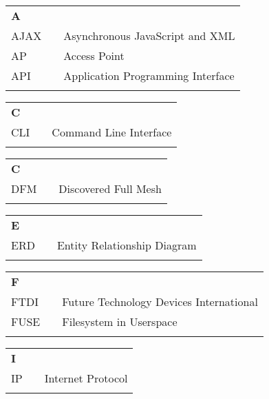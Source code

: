 \documentclass{mipathesis}
\begin{document}
\tableofcontents
{}
\listoftables
{}
\listoffigures
{}

\singkatan
\noindent

\begin{tabular}{p{20pt}p{3pt}l}
\textbf{A}\\
AJAX & & Asynchronous JavaScript and XML\\
AP & & Access Point\\
API & & Application Programming Interface\\
\\
\end{tabular}

\begin{tabular}{p{20pt}p{3pt}l}
\textbf{C}\\
CLI & & Command Line Interface\\
\\
\end{tabular}

\begin{tabular}{p{20pt}p{3pt}l}
\textbf{C}\\
DFM & & Discovered Full Mesh\\
\\
\end{tabular}

\begin{tabular}{p{20pt}p{3pt}l}
\textbf{E}\\
ERD & & Entity Relationship Diagram\\
\\
\end{tabular}

\begin{tabular}{p{20pt}p{3pt}l}
\textbf{F}\\
FTDI & & Future Technology Devices International\\
FUSE & & Filesystem in Userspace\\
\\
\end{tabular}

\begin{tabular}{p{20pt}p{3pt}l}
\textbf{I}\\
IP & & Internet Protocol\\
\\
\end{tabular}
\end{document}
